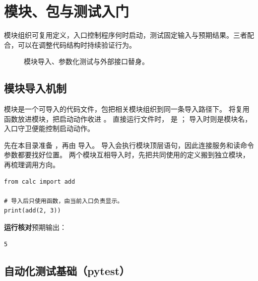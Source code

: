 \chapter{模块、包与测试入门}
\label{ch:07-outline}

模块组织可复用定义，入口控制程序何时启动，测试固定输入与预期结果。三者配合，可以在调整代码结构时持续验证行为。


\begin{figure}[htbp]
  \centering
  \caption*{模块导入、参数化测试与外部接口替身。}
\end{figure}


\section{模块导入机制}

模块是一个可导入的代码文件，包把相关模块组织到同一条导入路径下。
将复用函数放进模块，把启动动作收进 。
直接运行文件时， 是 ；
导入时则是模块名，入口守卫便能控制启动动作。

先在本目录准备 ，再由  导入。
导入会执行模块顶层语句，因此连接服务和读命令参数都要找好位置。
两个模块互相导入时，先把共同使用的定义搬到独立模块，再梳理调用方向。


\begin{lstlisting}[title={\code{use_calc.py}}]
from calc import add

# 导入后只使用函数，由当前入口负责显示。
print(add(2, 3))
\end{lstlisting}


\textbf{运行核对}\enspace 预期输出：
\begin{lstlisting}[language={},numbers=none]
5
\end{lstlisting}

\par


\section[自动化测试基础]{自动化测试基础（pytest）}

